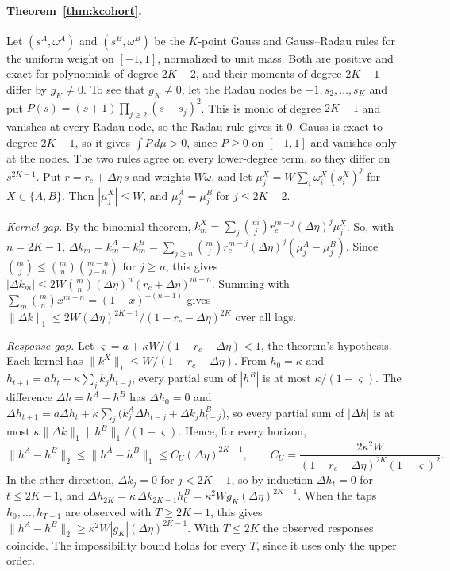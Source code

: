 \documentclass[12pt]{article}
\theoremstyle{definition}
\theoremstyle{remark}
\begin{document}
\paragraph{Theorem~\ref{thm:kcohort}.} Let $(s^A,\omega^A)$ and $(s^B,\omega^B)$ be the $K$-point Gauss and Gauss--Radau rules for the uniform weight on $[-1,1]$, normalized to unit mass. Both are positive and exact for polynomials of degree $2K-2$, and their moments of degree $2K-1$ differ by $g_K\neq0$. To see that $g_K\ne0$, let the Radau nodes be $-1,s_2,\ldots,s_K$ and put $P(s)=(s+1)\prod_{j\ge2}(s-s_j)^2$. This is monic of degree $2K-1$ and vanishes at every Radau node, so the Radau rule gives it $0$. Gauss is exact to degree $2K-1$, so it gives $\int P\,d\mu>0$, since $P\ge0$ on $[-1,1]$ and vanishes only at the nodes. The two rules agree on every lower-degree term, so they differ on $s^{2K-1}$. Put $r=r_c+\Delta\eta\,s$ and weights $W\omega$, and let $\mu^X_j=W\sum_i\omega^X_i(s^X_i)^j$ for $X\in\{A,B\}$. Then $|\mu^X_j|\le W$, and $\mu^A_j=\mu^B_j$ for $j\le2K-2$.

\emph{Kernel gap.} By the binomial theorem, $k^X_m=\sum_j\binom mj r_c^{m-j}(\Delta\eta)^j\mu^X_j$. So, with $n=2K-1$, $\Delta k_m=k^A_m-k^B_m=\sum_{j\ge n}\binom mj r_c^{m-j}(\Delta\eta)^j(\mu^A_j-\mu^B_j)$. Since $\binom mj\le\binom mn\binom{m-n}{j-n}$ for $j\ge n$, this gives $|\Delta k_m|\le2W\binom mn(\Delta\eta)^n(r_c+\Delta\eta)^{m-n}$. Summing with $\sum_m\binom mn x^{m-n}=(1-x)^{-(n+1)}$ gives $\|\Delta k\|_1\le2W(\Delta\eta)^{2K-1}/(1-r_c-\Delta\eta)^{2K}$ over all lags.

\emph{Response gap.} Let $\varsigma=a+\kappa W/(1-r_c-\Delta\eta)<1$, the theorem's hypothesis. Each kernel has $\|k^X\|_1\le W/(1-r_c-\Delta\eta)$. From $h_0=\kappa$ and $h_{t+1}=ah_t+\kappa\sum_jk_jh_{t-j}$, every partial sum of $|h^B|$ is at most $\kappa/(1-\varsigma)$. The difference $\Delta h=h^A-h^B$ has $\Delta h_0=0$ and $\Delta h_{t+1}=a\Delta h_t+\kappa\sum_j\bigl(k^A_j\Delta h_{t-j}+\Delta k_jh^B_{t-j}\bigr)$, so every partial sum of $|\Delta h|$ is at most $\kappa\|\Delta k\|_1\|h^B\|_1/(1-\varsigma)$. Hence, for every horizon,
\[
\|h^A-h^B\|_2\le\|h^A-h^B\|_1\le C_U(\Delta\eta)^{2K-1},\qquad C_U=\frac{2\kappa^2W}{(1-r_c-\Delta\eta)^{2K}(1-\varsigma)^2}.
\]
In the other direction, $\Delta k_j=0$ for $j<2K-1$, so by induction $\Delta h_t=0$ for $t\le2K-1$, and $\Delta h_{2K}=\kappa\,\Delta k_{2K-1}h^B_0=\kappa^2Wg_K(\Delta\eta)^{2K-1}$. When the taps $h_0,\ldots,h_{T-1}$ are observed with $T\ge2K+1$, this gives $\|h^A-h^B\|_2\ge\kappa^2W|g_K|(\Delta\eta)^{2K-1}$. With $T\le2K$ the observed responses coincide. The impossibility bound holds for every $T$, since it uses only the upper order.
\end{document}
